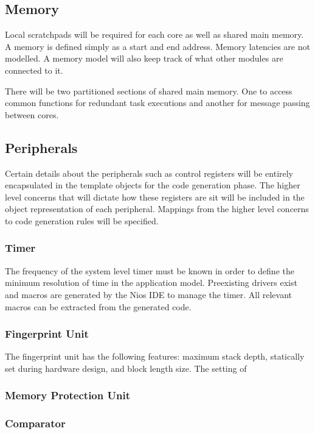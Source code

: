 \documentclass{article}
\begin{document}
\subsection{Memory}
Local scratchpads will be required for each core as well as shared main memory. A memory is defined simply as a start and end address. Memory latencies are not modelled. A memory model will also keep track of what other modules are connected to it.

There will be two partitioned sections of shared main memory. One to access common functions for redundant task executions and another for message passing between cores.

\subsection{Peripherals}
Certain details about the peripherals such as control registers will be entirely encapsulated in the template objects for the code generation phase. The higher level concerns that will dictate how these registers are sit will be included in the object representation of each peripheral. Mappings from the higher level concerns to code generation rules will be specified.

\subsubsection{Timer}
The frequency of the system level timer must be known in order to define the minimum resolution of time in the application model. Preexisting drivers exist and macros are generated by the Nios IDE to manage the timer. All relevant macros can be extracted from the generated code.

\subsubsection{Fingerprint Unit} 
The fingerprint unit has the following features: maximum stack depth, statically set during hardware design, and block length size. The setting of

\subsubsection{Memory Protection Unit}

\subsubsection{Comparator}
\end{document}
